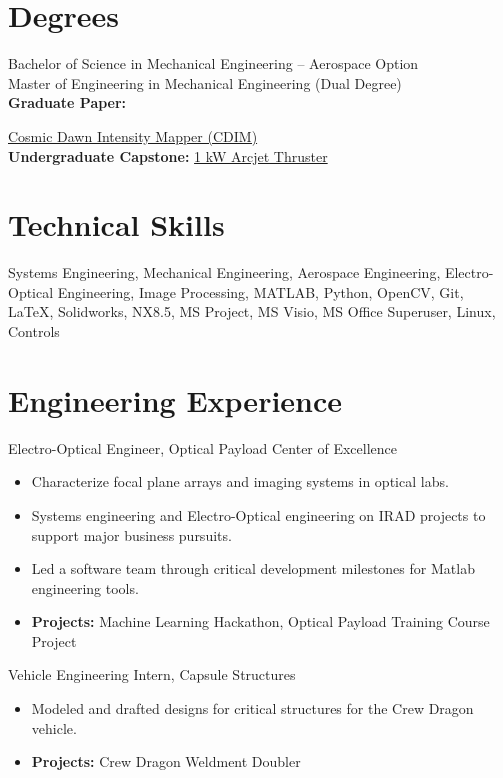 \documentclass[10pt,final,sans]{resume}
\begin{document}
\section{Degrees}
Bachelor of Science in Mechanical Engineering -- Aerospace Option \\
Master of Engineering in Mechanical Engineering (Dual Degree) \\
{\bf Graduate Paper:} {\href{https://github.com/runphilrun/CDIM-design/blob/master/cdim_design.pdf}{Cosmic Dawn Intensity Mapper (CDIM)} \\
{\bf Undergraduate Capstone:} \href{https://github.com/RIT-Space-Exploration/msd-P17101/blob/master/p17101.pdf}{1 kW Arcjet Thruster}

\section{Technical Skills}
Systems Engineering, Mechanical Engineering, Aerospace Engineering, Electro-Optical Engineering, Image Processing, MATLAB, Python, OpenCV, Git, {\textrm \LaTeX}, Solidworks, NX8.5, MS Project, MS Visio, MS Office Superuser, Linux, Controls

\section{Engineering Experience}
Electro-Optical Engineer, Optical Payload Center of Excellence
\begin{itemize}
  \item Characterize focal plane arrays and imaging systems in optical labs.
  \item Systems engineering and Electro-Optical engineering on IRAD projects to support major business pursuits.
  \item Led a software team through critical development milestones for Matlab engineering tools. 
  \item {\bf Projects:} Machine Learning Hackathon, Optical Payload Training Course Project
\end{itemize} 
Vehicle Engineering Intern, Capsule Structures
\begin{itemize}
  \item Modeled and drafted designs for critical structures for the Crew Dragon vehicle.
  \item {\bf Projects:} Crew Dragon Weldment Doubler
\end{itemize}

}
\end{document}

